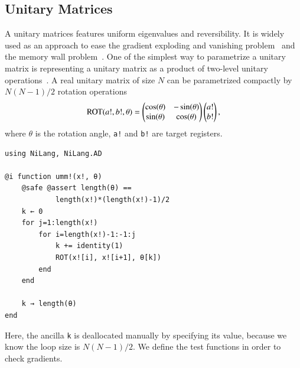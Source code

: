 \documentclass[aps,twocolumn,longbibliography,english,superscriptaddress]{revtex4-1}
\newcommand{\<}{\langle}
\renewcommand{\>}{\rangle}
\theoremstyle{definition}\newtheorem{definition}{\textit{Definition}}
\begin{document}
\subsection{Unitary Matrices}\label{sec:umm}
A unitary matrices features uniform eigenvalues and reversibility. It is widely used as an approach to ease the gradient exploding and vanishing problem~\cite{Arjovsky2015,Wisdom2016,Li2016} and the memory wall problem~\cite{Luo2019}.
One of the simplest way to parametrize a unitary matrix is representing a unitary matrix as a product of two-level unitary operations~\cite{Li2016}. A real unitary matrix of size $N$ can be parametrized compactly by $N(N-1)/2$ rotation operations~\cite{Li2013}
\begin{align}
    {\rm ROT}(a!, b!, \theta)  = \left(\begin{matrix}
        \cos(\theta) & - \sin(\theta)\\
        \sin(\theta)  & \cos(\theta)
    \end{matrix}\right)
    \left(\begin{matrix}
        a!\\
        b!
    \end{matrix}\right),
\end{align}
where \texttt{$\theta$} is the rotation angle, \texttt{a!} and \texttt{b!} are target registers.

\begin{minipage}{.44\textwidth}
\begin{lstlisting}[mathescape=true]
using NiLang, NiLang.AD

@i function umm!(x!, θ)
    @safe @assert length(θ) == 
            length(x!)*(length(x!)-1)/2
    k ← 0
    for j=1:length(x!)
        for i=length(x!)-1:-1:j
            k += identity(1)
            ROT(x![i], x![i+1], θ[k])
        end
    end

    k → length(θ)
end
\end{lstlisting}
\end{minipage}

Here, the ancilla \texttt{k} is deallocated manually by specifying its value, because we know the loop size is $N(N-1)/2$.
We define the test functions in order to check gradients.
\end{document}
